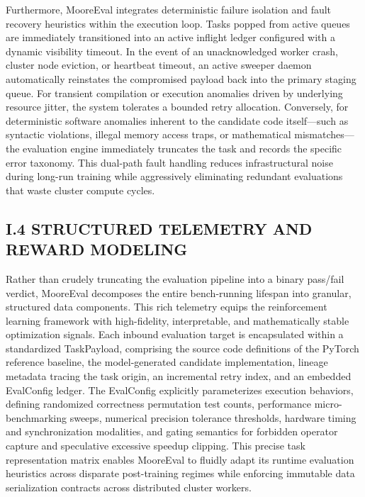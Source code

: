 \documentclass[
  10
]{article}
\begin{document}
Furthermore, MooreEval integrates deterministic failure isolation and
fault recovery heuristics within the execution loop. Tasks popped from
active queues are immediately transitioned into an active inflight
ledger configured with a dynamic visibility timeout. In the event of an
unacknowledged worker crash, cluster node eviction, or heartbeat
timeout, an active sweeper daemon automatically reinstates the
compromised payload back into the primary staging queue. For transient
compilation or execution anomalies driven by underlying resource jitter,
the system tolerates a bounded retry allocation. Conversely, for
deterministic software anomalies inherent to the candidate code
itself---such as syntactic violations, illegal memory access traps, or
mathematical mismatches---the evaluation engine immediately truncates
the task and records the specific error taxonomy. This dual-path fault
handling reduces infrastructural noise during long-run training while
aggressively eliminating redundant evaluations that waste cluster
compute cycles.

\subsection{I.4 STRUCTURED TELEMETRY AND REWARD
MODELING}\label{i.4-structured-telemetry-and-reward-modeling}

Rather than crudely truncating the evaluation pipeline into a binary
pass/fail verdict, MooreEval decomposes the entire bench-running
lifespan into granular, structured data components. This rich telemetry
equips the reinforcement learning framework with high-fidelity,
interpretable, and mathematically stable optimization signals. Each
inbound evaluation target is encapsulated within a standardized
TaskPayload, comprising the source code definitions of the PyTorch
reference baseline, the model-generated candidate implementation,
lineage metadata tracing the task origin, an incremental retry index,
and an embedded EvalConfig ledger. The EvalConfig explicitly
parameterizes execution behaviors, defining randomized correctness
permutation test counts, performance micro-benchmarking sweeps,
numerical precision tolerance thresholds, hardware timing and
synchronization modalities, and gating semantics for forbidden operator
capture and speculative excessive speedup clipping. This precise task
representation matrix enables MooreEval to fluidly adapt its runtime
evaluation heuristics across disparate post-training regimes while
enforcing immutable data serialization contracts across distributed
cluster workers.
\end{document}
